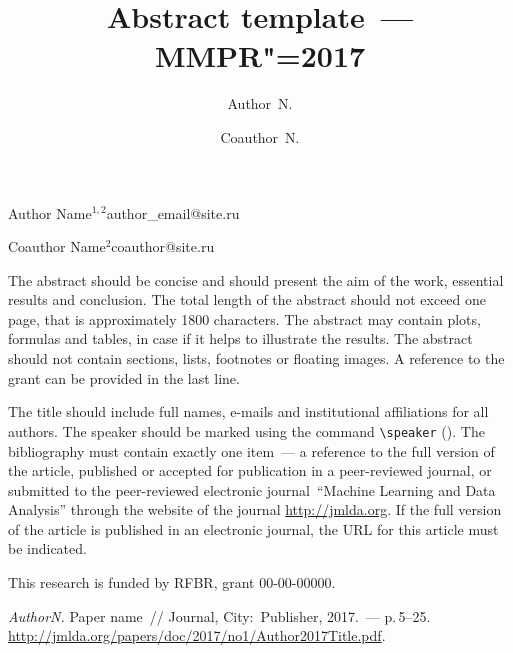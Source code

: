 \documentclass[twoside]{article}
\begin{document}
\English
\title{Abstract template~--- MMPR"=2017}
\author{Author~N.}{Author Name$^{1, 2}$}{author\_email@site.ru}
\author{Coauthor~N.}{Coauthor Name$^2$\speaker}{coauthor@site.ru}
\maketitle

The abstract should be concise and should present the aim of the work, essential results and conclusion.
The total length of the abstract should not exceed one page, that is approximately 1800 characters.
The abstract may contain plots, formulas and tables, in case if it helps to illustrate the results.
The abstract should not contain sections, lists, footnotes or floating images.
A reference to the grant can be provided in the last line.

The title should include full names, e-mails and institutional affiliations for all authors. The speaker should be marked using the command \verb|\speaker| (\speaker).
The bibliography must contain exactly one item~--- a reference to the full version of the article,
published or accepted for publication in a peer-reviewed journal,
or submitted to the peer-reviewed electronic journal~``Machine Learning and Data Analysis''
through the website of the journal \url{http://jmlda.org}.
If the full version of the article is published in an electronic journal, the URL for this article must be indicated.

This research is funded by RFBR, grant 00-00-00000.

\begin{thebibliography}{1}
    \emph{Author\;N.}
    Paper name~//
    Journal,
    City:~Publisher, 2017.~--- p.\,5--25.
    \url{http://jmlda.org/papers/doc/2017/no1/Author2017Title.pdf}.
\end{thebibliography}
\end{document}
